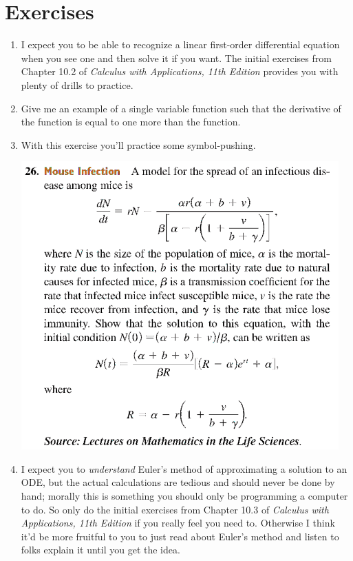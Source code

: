 \newpage

\section*{Exercises}

\begin{enumerate}
    \item %
        I expect you to be able to recognize a linear first-order
        differential equation when you see one and then solve it if you want.
        The initial exercises from Chapter 10.2 of 
        \emph{Calculus with Applications, 11th Edition}
        provides you with plenty of drills to practice.

    \item 
        Give me an example of a single variable function
        such that the derivative of the function is equal to 
        one more than the function.

    \item
        With this exercise you'll practice some symbol-pushing.
        \begin{center}
            \includegraphics[width=0.96\textwidth]{screenshots/26.png}
        \end{center}

    \item %
        I expect you to \emph{understand} Euler's method of approximating
        a solution to an ODE, but the actual calculations are tedious
        and should never be done by hand; morally this is something you
        should only be programming a computer to do.
        So only do the initial exercises from Chapter 10.3 of 
        \emph{Calculus with Applications, 11th Edition}
        if you really feel you need to. 
        Otherwise I think it'd be more fruitful to you 
        to just read about Euler's method and listen to folks explain it
        until you get the idea.


\end{enumerate}
